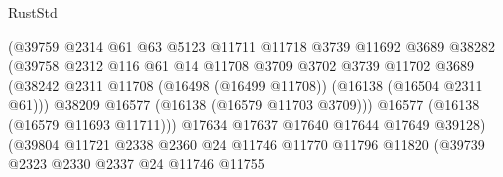 \begin{lexlean}{RustStd}
\begin{coremodule}
                                      (@39759
                                        @2314
                                        @61
                                        @63
                                        @5123
                                        @11711
                                        @11718
                                        @3739
                                        @11692
                                        @3689
                                        @38282
                                        (@39758
                                          @2312
                                          @116
                                          @61
                                          @14
                                          @11708
                                          @3709
                                          @3702
                                          @3739
                                          @11702
                                          @3689
                                          (@38242
                                            @2311
                                            @11708
                                            (@16498 (@16499 @11708))
                                            (@16138 (@16504 @2311 @61)))
                                          @38209
                                          @16577
                                          (@16138 (@16579 @11703 @3709)))
                                        @16577
                                        (@16138 (@16579 @11693 @11711)))
                                      @17634
                                      @17637
                                      @17640
                                      @17644
                                      @17649
                                      @39128)
                                    (@39804
                                      @11721
                                      @2338
                                      @2360
                                      @24
                                      @11746
                                      @11770
                                      @11796
                                      @11820
                                      (@39739
                                        @2323
                                        @2330
                                        @2337
                                        @24
                                        @11746
                                        @11755

\end{coremodule}
\end{lexlean}
